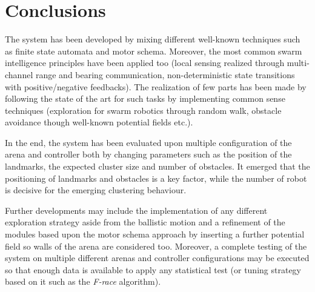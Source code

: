 \chapter{Conclusions}

The system has been developed by mixing different well-known techniques such as finite state automata and motor schema. Moreover, the most common swarm intelligence principles have been applied too (local sensing realized through multi-channel range and bearing communication, non-deterministic state transitions with positive/negative feedbacks). The realization of few parts has been made by following the state of the art for such tasks by implementing common sense techniques (exploration for swarm robotics through random walk, obstacle avoidance though  well-known potential fields etc.). 

\noindent
In the end, the system has been evaluated upon multiple configuration of the arena and controller both by changing parameters such as the position of the landmarks, the expected cluster size and number of obstacles. It emerged that the positioning of landmarks and obstacles is a key factor, while the number of robot is decisive for the emerging clustering behaviour.

\bigskip
Further developments may include the implementation of any different exploration strategy aside from the ballistic motion and a refinement of the modules based upon the motor schema approach by inserting a further potential field so walls of the arena are considered too. Moreover, a complete testing of the system on multiple different arenas and controller configurations may be executed so that enough data is available to apply any statistical test (or tuning strategy based on it such as the \textit{F-race} algorithm).      